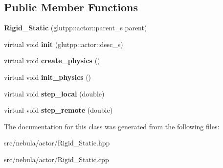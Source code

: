 \subsection*{\-Public \-Member \-Functions}
\begin{DoxyCompactItemize}
\item 
\hypertarget{classneb_1_1Actor_1_1Rigid__Static_a966402830e96d2a4982a845a6352b0ee}{{\bfseries \-Rigid\-\_\-\-Static} (glutpp\-::actor\-::parent\-\_\-s parent)}\label{classneb_1_1Actor_1_1Rigid__Static_a966402830e96d2a4982a845a6352b0ee}

\item 
\hypertarget{classneb_1_1Actor_1_1Rigid__Static_ab7d84259cceef7f16b9834de1ef1f2d9}{virtual void {\bfseries init} (glutpp\-::actor\-::desc\-\_\-s)}\label{classneb_1_1Actor_1_1Rigid__Static_ab7d84259cceef7f16b9834de1ef1f2d9}

\item 
\hypertarget{classneb_1_1Actor_1_1Rigid__Static_a9e8eec801df7d03445a9b4dd01fb8d67}{virtual void {\bfseries create\-\_\-physics} ()}\label{classneb_1_1Actor_1_1Rigid__Static_a9e8eec801df7d03445a9b4dd01fb8d67}

\item 
\hypertarget{classneb_1_1Actor_1_1Rigid__Static_a33c50f89376464b5f9ff2c0299fc211c}{virtual void {\bfseries init\-\_\-physics} ()}\label{classneb_1_1Actor_1_1Rigid__Static_a33c50f89376464b5f9ff2c0299fc211c}

\item 
\hypertarget{classneb_1_1Actor_1_1Rigid__Static_afca31b618b88aa4b20ca578a0a1e3a75}{virtual void {\bfseries step\-\_\-local} (double)}\label{classneb_1_1Actor_1_1Rigid__Static_afca31b618b88aa4b20ca578a0a1e3a75}

\item 
\hypertarget{classneb_1_1Actor_1_1Rigid__Static_a044fc1ffd31ca296271b00021a934ed6}{virtual void {\bfseries step\-\_\-remote} (double)}\label{classneb_1_1Actor_1_1Rigid__Static_a044fc1ffd31ca296271b00021a934ed6}

\end{DoxyCompactItemize}


\-The documentation for this class was generated from the following files\-:\begin{DoxyCompactItemize}
\item 
src/nebula/actor/\-Rigid\-\_\-\-Static.\-hpp\item 
src/nebula/actor/\-Rigid\-\_\-\-Static.\-cpp\end{DoxyCompactItemize}
